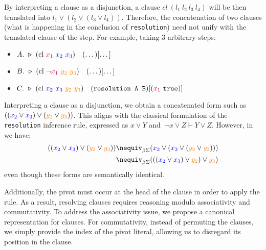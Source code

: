 \begin{remark}
By interpreting a clause as a disjunction, a clause $cl~(l_1~l_2~l_3~l_4)$ will be then translated into $l_1 \lor (l_2 \lor (l_3 \lor l_4))$.
 Therefore, the concatenation of two clauses (what is happening in the conclusion of \texttt{resolution}) need not unify with the translated clause of the step. For example, taking 3 arbitrary steps:

\begin{itemize}
    \setlength{\itemsep}{5pt}
    \setlength{\parskip}{0pt}
    \item[] $A.~\triangleright~(\text{cl}~\textcolor{purple}{x_1}~\textcolor{blue}{x_2~x_3}) \quad (\dots)[\dots]$
    \item[] $B.~\triangleright~ (\text{cl}~\textcolor{purple}{\neg x_1}~\textcolor{orange}{y_2}~\textcolor{orange}{y_3}) \quad  (\dots)[\dots]$
    \item[] $C.~\triangleright~(\text{cl}~\textcolor{blue}{x_2~x_3}~\textcolor{orange}{y_2~y_3}) \quad (\texttt{resolution A B})[(\textcolor{purple}{x_1}~\texttt{true})]$
\end{itemize}

Interpreting a clause as a disjunction, we obtain a concatenated form such as $((\textcolor{blue}{x_2} \lor \textcolor{blue}{x_3}) \lor (\textcolor{orange}{y_2} \lor \textcolor{orange}{y_3}))$.
This aligns with the classical formulation of the \texttt{resolution} inference rule, expressed as $x \lor Y$ and $\ \neg x \lor Z \vdash Y \lor Z$.
However, in {\lpm} we have:
\begin{align*}
((\textcolor{blue}{x_2} \lor \textcolor{blue}{x_3}) \lor (\textcolor{orange}{y_2} \lor \textcolor{orange}{y_3})) & \nequiv_{\beta\Sigma} (\textcolor{blue}{x_2} \lor (\textcolor{blue}{x_3} \lor (\textcolor{orange}{y_2} \lor \textcolor{orange}{y_3}))) \\
& \nequiv_{\beta\Sigma} (((\textcolor{blue}{x_2} \lor \textcolor{blue}{x_3}) \lor \textcolor{orange}{y_2}) \lor \textcolor{orange}{y_3})
\end{align*}
even though these forms are semantically identical.

Additionally, the pivot must occur at the head of the clause in order to apply the  rule.
As a result, resolving clauses requires reasoning modulo associativity and commutativity.
To address the associativity issue, we propose a canonical representation for clauses.
For commutativity, instead of permuting the clauses, we simply provide the index of the pivot literal, allowing us to disregard its position in the clause.

\end{remark}

